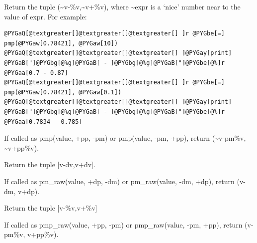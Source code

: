 \documentclass[letterpaper,10pt,english]{sphinxmanual}
\begin{document}

\begin{fulllineitems}
\label{api/mystic.bounds:refl1d.mystic.bounds.pmp}
Return the tuple (\textasciitilde{}v-\%v,\textasciitilde{}v+\%v), where \textasciitilde{}expr is a `nice' number near to
the value of expr.  For example:

\begin{Verbatim}[commandchars=@\[\]]
@PYGaQ[@textgreater[]@textgreater[]@textgreater[] ]r @PYGbe[=] pmp(@PYGaw[0.78421], @PYGaw[10])
@PYGaQ[@textgreater[]@textgreater[]@textgreater[] ]@PYGay[print] @PYGaB["]@PYGbg[@%g]@PYGaB[ - ]@PYGbg[@%g]@PYGaB["]@PYGbe[@%]r
@PYGaa[0.7 - 0.87]
@PYGaQ[@textgreater[]@textgreater[]@textgreater[] ]r @PYGbe[=] pmp(@PYGaw[0.78421], @PYGaw[0.1])
@PYGaQ[@textgreater[]@textgreater[]@textgreater[] ]@PYGay[print] @PYGaB["]@PYGbg[@%g]@PYGaB[ - ]@PYGbg[@%g]@PYGaB["]@PYGbe[@%]r
@PYGaa[0.7834 - 0.785]
\end{Verbatim}

If called as pmp(value, +pp, -pm) or pmp(value, -pm, +pp),
return (\textasciitilde{}v-pm\%v, \textasciitilde{}v+pp\%v).

\end{fulllineitems}


\begin{fulllineitems}
\label{api/mystic.bounds:refl1d.mystic.bounds.pm_raw}
Return the tuple {[}v-dv,v+dv{]}.

If called as pm\_raw(value, +dp, -dm) or pm\_raw(value, -dm, +dp),
return (v-dm, v+dp).

\end{fulllineitems}


\begin{fulllineitems}
\label{api/mystic.bounds:refl1d.mystic.bounds.pmp_raw}
Return the tuple {[}v-\%v,v+\%v{]}

If called as pmp\_raw(value, +pp, -pm) or pmp\_raw(value, -pm, +pp),
return (v-pm\%v, v+pp\%v).

\end{fulllineitems}
\end{document}
